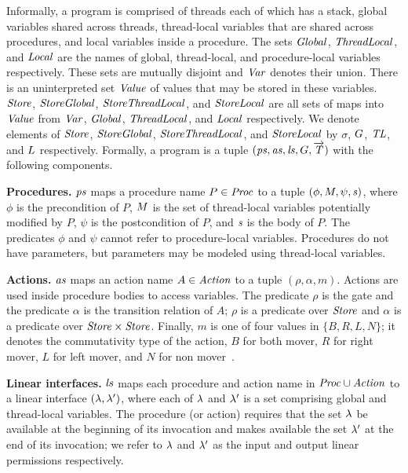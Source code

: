 Informally, a \civl program is comprised of threads each of which has a stack, global variables shared across threads, 
thread-local variables that are shared across procedures, and local variables inside a procedure.
The sets $\mathit{Global}$, $\mathit{ThreadLocal}$, and $\mathit{Local}$ are the names of global, thread-local, and procedure-local variables 
respectively.
These sets are mutually disjoint and $\mathit{Var}$ denotes their union.
There is an uninterpreted set $\mathit{Value}$ of values that may be stored in these variables.
$\mathit{Store}$, $\mathit{StoreGlobal}$, $\mathit{StoreThreadLocal}$, and $\mathit{StoreLocal}$ are all sets of maps into $\mathit{Value}$
from $\mathit{Var}$, $\mathit{Global}$, $\mathit{ThreadLocal}$, and $\mathit{Local}$ respectively.
We denote elements of $\mathit{Store}$, $\mathit{StoreGlobal}$, $\mathit{StoreThreadLocal}$, and $\mathit{StoreLocal}$
by $\sigma$, $G$, $\mathit{TL}$, and $L$ respectively.
Formally, a \civl program is a tuple $(\mathit{ps}, \mathit{as}, \mathit{ls}, G, \overrightarrow{\mathit{T}})$ with the following components.

\noindent
{\bf Procedures.}
$\mathit{ps}$ maps a procedure name $P \in \mathit{Proc}$ to a tuple $(\phi, M, \psi, \mathit{s})$, 
where $\phi$ is the precondition of $P$, $M$ is the set of thread-local variables potentially modified by $P$, 
$\psi$ is the postcondition of $P$, and $\mathit{s}$ is the body of $P$.
The predicates $\phi$ and $\psi$ cannot refer to procedure-local variables.
Procedures do not have parameters, but parameters may be modeled using thread-local variables.

\noindent
{\bf Actions.}
$\mathit{as}$ maps an action name $A \in \mathit{Action}$ to a tuple $(\rho,\alpha,m)$.
Actions are used inside procedure bodies to access variables.
The predicate $\rho$ is the gate and the predicate $\alpha$ is the transition relation of $A$;
$\rho$ is a predicate over $\mathit{Store}$ and $\alpha$ is a predicate over $\mathit{Store} \times \mathit{Store}$.
Finally, $m$ is one of four values in $\{B,R,L,N\}$;
it denotes the commutativity type of the action, $B$ for both mover, $R$ for right mover, $L$ for left mover, 
and $N$ for non mover~\cite{FlanaganFLQ08}. 

\noindent
{\bf Linear interfaces.}
$\mathit{ls}$ maps each procedure and action name in $\mathit{Proc} \cup \mathit{Action}$ to a linear interface 
$(\lambda,\lambda')$, where each of $\lambda$ and $\lambda'$ is a set comprising global and thread-local variables.
The procedure (or action) requires that the set $\lambda$ be available at the beginning of its invocation 
and makes available the set $\lambda'$ at the end of its invocation; 
we refer to $\lambda$ and $\lambda'$ as the input and output linear permissions respectively.

